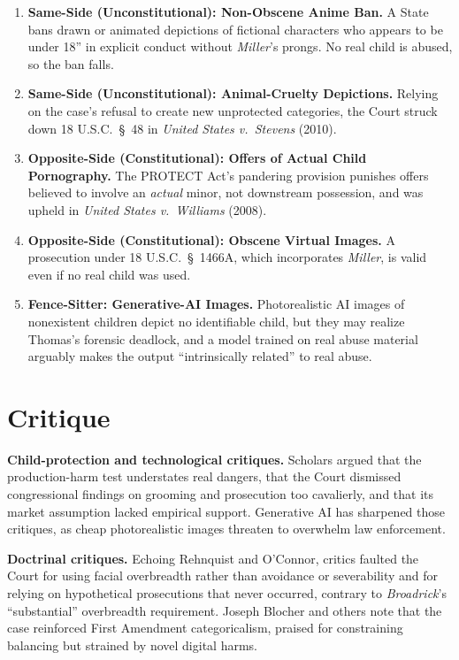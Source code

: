 \documentclass[12pt]{article}
\begin{document}
\begin{enumerate}
\item \textbf{Same-Side (Unconstitutional): Non-Obscene Anime Ban.} A State bans drawn or animated depictions of fictional characters who appears to be under 18'' in explicit conduct without \textit{Miller}'s prongs. No real child is abused, so the ban falls.
\item \textbf{Same-Side (Unconstitutional): Animal-Cruelty Depictions.} Relying on the case's refusal to create new unprotected categories, the Court struck down 18 U.S.C.\ \S~48 in \textit{United States v.\ Stevens} (2010).
\item \textbf{Opposite-Side (Constitutional): Offers of Actual Child Pornography.} The PROTECT Act's pandering provision punishes offers believed to involve an \textit{actual} minor, not downstream possession, and was upheld in \textit{United States v.\ Williams} (2008).
\item \textbf{Opposite-Side (Constitutional): Obscene Virtual Images.} A prosecution under 18 U.S.C.\ \S~1466A, which incorporates \textit{Miller}, is valid even if no real child was used.
\item \textbf{Fence-Sitter: Generative-AI Images.} Photorealistic AI images of nonexistent children depict no identifiable child, but they may realize Thomas's forensic deadlock, and a model trained on real abuse material arguably makes the output ``intrinsically related'' to real abuse.
\end{enumerate}

\section{Critique}

\textbf{Child-protection and technological critiques.} Scholars argued that the production-harm test understates real dangers, that the Court dismissed congressional findings on grooming and prosecution too cavalierly, and that its market assumption lacked empirical support. Generative AI has sharpened those critiques, as cheap photorealistic images threaten to overwhelm law enforcement.

\textbf{Doctrinal critiques.} Echoing Rehnquist and O'Connor, critics faulted the Court for using facial overbreadth rather than avoidance or severability and for relying on hypothetical prosecutions that never occurred, contrary to \textit{Broadrick}'s ``substantial'' overbreadth requirement. Joseph Blocher and others note that the case reinforced First Amendment categoricalism, praised for constraining balancing but strained by novel digital harms.
\end{document}
